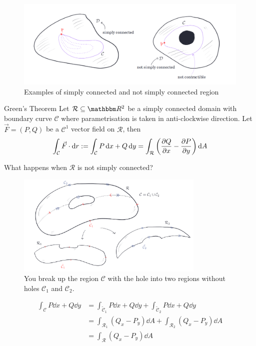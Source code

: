 \documentclass[Analysis-3]{subfiles}
\begin{document}
\begin{figure}[h]
    \centering
    \includegraphics[width=\textwidth]{figures/lec27.4.png}    
    \caption{Examples of simply connected and not simply connected region}
    \label{fig4:27}
\end{figure}

\begin{Thm}{Green's Theorem}{}\label{thm2:27}
    Let $\mathcal{R} \subseteq \R^2 $ be a simply connected domain with boundary curve $\mathcal{C}$ where parametrisation is taken in anti-clockwise direction. Let $\vec{F} = (P,Q)$ be a $\mathscr{C}^1$ vector field on $\mathcal{R}$, then 
\[
    \int_{\mathcal{C}} \vec{F} \cdot \dd r := \int_{\mathcal{C}} P \, \dd x + Q \, \dd y = \int_{\mathcal{R}} \left( \pdv{Q}{x} - \pdv{P}{y}\right) \dd A 
\]
\end{Thm}

What happens when $\mathcal{R}$ is not simply connected? 
\begin{figure}[H]
    \centering
    \includegraphics[width=0.8\textwidth]{figures/lec27.5.png}
    \caption{You break up the region $\mathcal{C}$ with the hole into two regions without holes $\mathcal{C}_1$ and $\mathcal{C}_2$.}
    \label{fig5:27}
\end{figure}
\begin{align*}
    \int_{\mathcal{C}} P \dd x + Q \dd y &= \int_{\tilde{\mathcal{C}}_1} P \dd x + Q \dd y + \int_{\tilde{\mathcal{C}}_2} P \dd x + Q \dd y \\ 
    &= \int_{\mathcal{R}_1} (Q_x - P_y) \dd A + \int_{\mathcal{R}_2} (Q_x - P_y) \dd A \\ 
    &= \int_{\mathcal{R}} (Q_x - P_y) \dd A
\end{align*}
\end{document}
